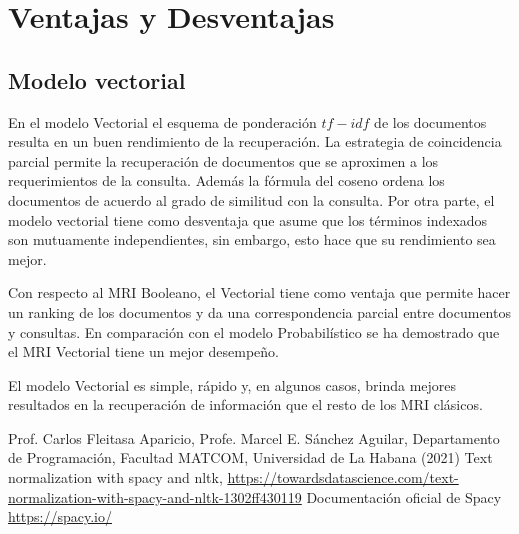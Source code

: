 \documentclass[runningheads,a4paper]{llncs}
\begin{document}


\section{Ventajas y Desventajas}\label{sec:ventajas-y-desventajas}

\subsection{Modelo vectorial}\label{subsec:modelo-vectorial}
En el modelo Vectorial el esquema de ponderación $tf-idf$ de los documentos resulta en un buen rendimiento de la recuperación.
La estrategia de coincidencia parcial permite la recuperación de documentos que se aproximen a los requerimientos de la consulta.
Además la fórmula del coseno ordena los documentos de acuerdo al grado de similitud con la consulta.
Por otra parte, el modelo vectorial tiene como desventaja que asume que los términos indexados son mutuamente independientes, sin embargo, esto hace que su rendimiento sea mejor.

Con respecto al MRI Booleano, el Vectorial tiene como ventaja que permite hacer un ranking de los documentos y da una correspondencia parcial entre documentos y consultas.
En comparación con el modelo Probabilístico se ha demostrado que el MRI Vectorial tiene un mejor desempeño.

El modelo Vectorial es simple, rápido y, en algunos casos, brinda mejores resultados en la recuperación de información que el resto de los MRI clásicos.



\begin{thebibliography}{4}

 Prof.
Carlos Fleitasa Aparicio, Profe.
Marcel E. Sánchez Aguilar, Departamento de Programación, Facultad MATCOM, Universidad de La Habana (2021)
 Text normalization with spacy and nltk, \url{https://towardsdatascience.com/text-normalization-with-spacy-and-nltk-1302ff430119}
 Documentación oficial de Spacy \url{https://spacy.io/}

\end{thebibliography}
\end{document}
